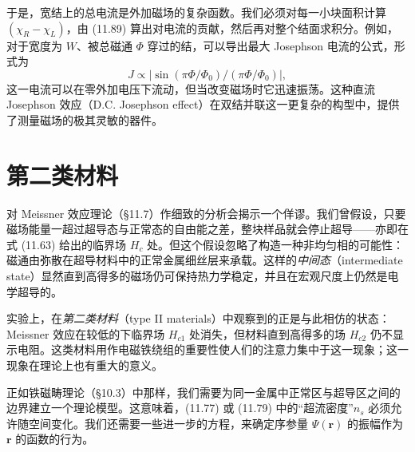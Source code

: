 于是，宽结上的总电流是外加磁场的复杂函数。我们必须对每一小块面积计算 $(\chi_R - \chi_L)$，由 (11.89) 算出对电流的贡献，然后再对整个结面求积分。例如，对于宽度为 $W$、被总磁通 $\Phi$ 穿过的结，可以导出最大 Josephson 电流的公式，形式为
\begin{equation*}
J \propto \left|\sin(\pi\Phi/\Phi_0)\big/(\pi\Phi/\Phi_0)\right|,
\tag{11.95}
\end{equation*}
这一电流可以在零外加电压下流动，但当改变磁场时它迅速振荡。这种直流 Josephson 效应（D.C. Josephson effect）在双结并联这一更复杂的构型中，提供了测量磁场的极其灵敏的器件。

\section{第二类材料}

对 Meissner 效应理论（§11.7）作细致的分析会揭示一个佯谬。我们曾假设，只要磁场能量一超过超导态与正常态的自由能之差，整块样品就会停止超导——亦即在式 (11.63) 给出的临界场 $H_c$ 处。但这个假设忽略了构造一种非均匀相的可能性：磁通由弥散在超导材料中的正常金属细丝层来承载。这样的\emph{中间态}（intermediate state）显然直到高得多的磁场仍可保持热力学稳定，并且在宏观尺度上仍然是电学超导的。

实验上，在\emph{第二类材料}（type II materials）中观察到的正是与此相仿的状态：Meissner 效应在较低的下临界场 $H_{c1}$ 处消失，但材料直到高得多的场 $H_{c2}$ 仍不显示电阻。这类材料用作电磁铁绕组的重要性使人们的注意力集中于这一现象；这一现象在理论上也有重大的意义。

正如铁磁畴理论（§10.3）中那样，我们需要为同一金属中正常区与超导区之间的边界建立一个理论模型。这意味着，(11.77) 或 (11.79) 中的“超流密度”$n_s$ 必须允许随空间变化。我们还需要一些进一步的方程，来确定序参量 $\Psi(\mathbf{r})$ 的振幅作为 $\mathbf{r}$ 的函数的行为。

